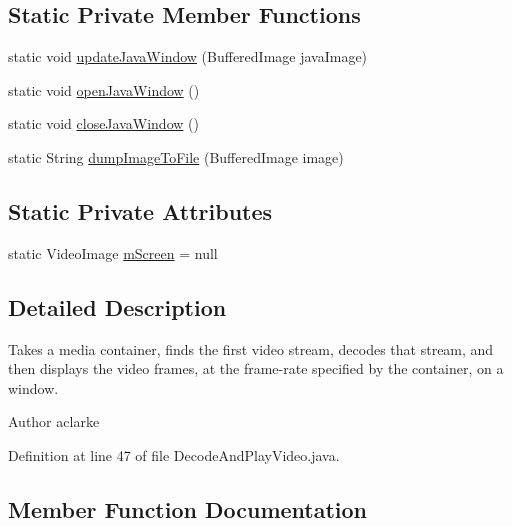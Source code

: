 \subsection*{Static Private Member Functions}
\begin{DoxyCompactItemize}
\item 
static void \hyperlink{classworkspace_1_1_a_r_drone_stream_image_1_1src_1_1_decode_and_play_video_a6db6d52da537beedda90a3fa39ce85af}{update\+Java\+Window} (Buffered\+Image java\+Image)
\item 
static void \hyperlink{classworkspace_1_1_a_r_drone_stream_image_1_1src_1_1_decode_and_play_video_aa49a37446f884c860002ed73ae145601}{open\+Java\+Window} ()
\item 
static void \hyperlink{classworkspace_1_1_a_r_drone_stream_image_1_1src_1_1_decode_and_play_video_a63333fed325f6ec886cf76f9704cf6f0}{close\+Java\+Window} ()
\item 
static String \hyperlink{classworkspace_1_1_a_r_drone_stream_image_1_1src_1_1_decode_and_play_video_a4b64105523009d77a348998cce13aa15}{dump\+Image\+To\+File} (Buffered\+Image image)
\end{DoxyCompactItemize}
\subsection*{Static Private Attributes}
\begin{DoxyCompactItemize}
\item 
static Video\+Image \hyperlink{classworkspace_1_1_a_r_drone_stream_image_1_1src_1_1_decode_and_play_video_a6ba754690ce0697ca5b6873615f96f02}{m\+Screen} = null
\end{DoxyCompactItemize}


\subsection{Detailed Description}
Takes a media container, finds the first video stream, decodes that stream, and then displays the video frames, at the frame-\/rate specified by the container, on a window.

\begin{DoxyAuthor}{Author}
aclarke 
\end{DoxyAuthor}


Definition at line 47 of file Decode\+And\+Play\+Video.\+java.



\subsection{Member Function Documentation}
\hypertarget{classworkspace_1_1_a_r_drone_stream_image_1_1src_1_1_decode_and_play_video_a63333fed325f6ec886cf76f9704cf6f0}{}
